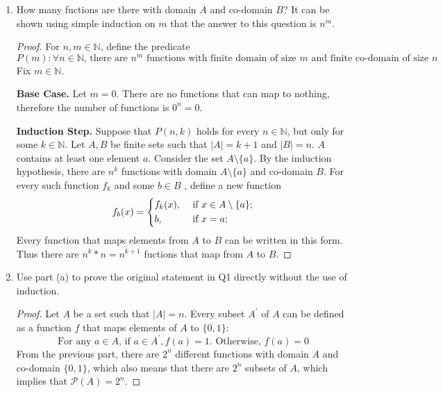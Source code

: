 \documentclass[11pt]{article}
\begin{document}
    \begin{enumerate}[label=\alph*)]
        \item How many fuctions are there with domain \(A\) and co-domain \(B\)?
        It can be shown using simple induction on \(m\) that the answer to this question is \(n^m\).
        \begin{proof}
            For \(n,m \in \mathbb{N} \), define the predicate
            \[
                P(m) \colon \forall n \in \mathbb{N} \text{, there are } n^m \text{ functions with finite domain of size } m \text{ and finite co-domain of size } n
            \]
            Fix \(m \in \mathbb{N}\).

            \textbf{Base Case.} Let \(m = 0\). There are no functions that can map to nothing, therefore the number of functions is \(0^n = 0\).

            \textbf{Induction Step.} Suppose that \(P(n, k)\) holds for every \(n \in \mathbb{N}\), but only for some \(k \in \mathbb{N}\). Let \(A, B\) be finite sets such that \(\left\vert A \right\vert = k+1\) and \(\left\vert B \right\vert = n\). \(A\) contains at least one element \(a\). Consider the set \(A\setminus\{a\}\). By the induction hypothesis, there are \(n^k\) functions with domain \(A\setminus\{a\}\) and co-domain \(B\). For every such function \(f_k\) and some \(b \in B\) , define a new function
            \[
                f_b(x) = \begin{dcases}
                    f_k(x), &\text{ if } x \in A\setminus \{a\} ;\\
                    b, &\text{ if } x=a;
                \end{dcases}
            \]
            Every function that maps elements from \(A\) to \(B\) can be written in this form. Thus there are \(n^k*n = n^{k+1} \) fuctions that map from \(A\) to \(B\).

        \end{proof}

        \item Use part (a) to prove the original statement in Q1 directly without the use of induction.
        \begin{proof}
            Let \(A\) be a set such that \(|A| = n\). Every subset \(A^\prime\) of \(A\) can be defined as a function \(f\) that maps elements of \(A\) to \(\{0,1\}\):
            \[
                \text{For any } a \in A \text{, if } a \in A^\prime, f(a) = 1 \text{. Otherwise, } f(a) = 0
            \]
            From the previous part, there are \(2^n\) different functions with domain \(A\) and co-domain \(\{0,1\}\), which also means that there are \(2^n\) subsets of \(A\), which implies that \(\mathcal{P} (A)=2^n\).

        \end{proof}
    \end{enumerate}
\end{document}
